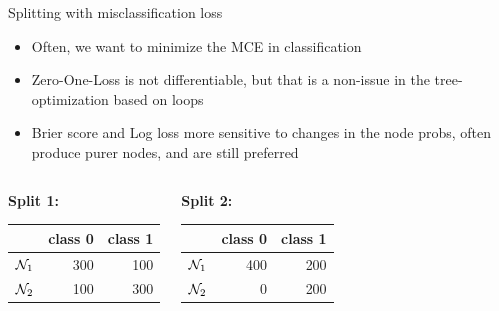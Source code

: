 \documentclass[11pt,compress,t,notes=noshow, xcolor=table]{beamer}
\begin{document}
\begin{vbframe}{Splitting with misclassification loss}

\begin{itemize}
\item Often, we want to minimize the MCE in classification
\item Zero-One-Loss is not differentiable, but that is a non-issue in the tree-optimization based on loops
\item Brier score and Log loss more sensitive to changes in the node probs, often produce purer nodes, and are still preferred


\end{itemize}


\begin{small}
\begin{columns}[T,onlytextwidth]
\begin{center}
\textbf{Split 1:} \\
\vspace{0.25cm}
\begin{table}[ht]
\centering
\begin{tabular}{rrr}
  \hline
 & class 0 & class 1 \\ 
  \hline
$\mathcal{N}_1$ & 300 & 100 \\ 
  $\mathcal{N}_2$ & 100 & 300 \\ 
   \hline
\end{tabular}
\end{table}

\end{center}
\begin{center}
\textbf{Split 2:} \\
\vspace{0.25cm}
\begin{table}[ht]
\centering
\begin{tabular}{rrr}
  \hline
 & class 0 & class 1 \\ 
  \hline
$\mathcal{N}_1$ & 400 & 200 \\ 
  $\mathcal{N}_2$ &   0 & 200 \\ 
   \hline
\end{tabular}
\end{table}

\end{center}
\end{columns}
\end{small}


\end{vbframe}
\end{document}
